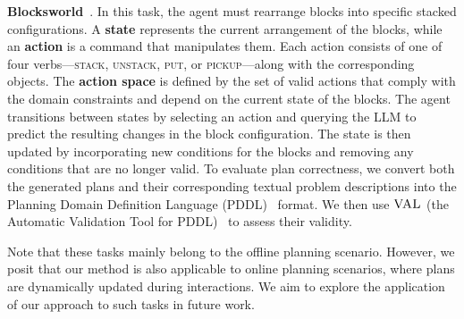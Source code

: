 \noindent \textbf{Blocksworld}~\cite{valmeekam2022large}. In this task, the agent must rearrange blocks into specific stacked configurations. A \textbf{state} represents the current arrangement of the blocks, while an \textbf{action} is a command that manipulates them. Each action consists of one of four verbs—\textsc{stack}, \textsc{unstack}, \textsc{put}, or \textsc{pickup}—along with the corresponding objects. The \textbf{action space} is defined by the set of valid actions that comply with the domain constraints and depend on the current state of the blocks.
The agent transitions between states by selecting an action and querying the LLM to predict the resulting changes in the block configuration. The state is then updated by incorporating new conditions for the blocks and removing any conditions that are no longer valid. To evaluate plan correctness, we convert both the generated plans and their corresponding textual problem descriptions into the Planning Domain Definition Language (PDDL)~\cite{silver2024generalized} format. We then use $\textsc{VAL}$ (the Automatic Validation Tool for PDDL)~\cite{howey2003automatic} to assess their validity.


Note that these tasks mainly belong to the offline planning scenario. However, we posit that our method is also applicable to online planning scenarios, where plans are dynamically updated during interactions. We aim to explore the application of our approach to such tasks in future work.

